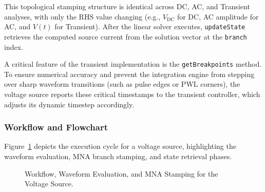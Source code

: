 This topological stamping structure is identical across DC, AC, and Transient analyses, with only the RHS value changing (e.g., $V_{\text{DC}}$ for DC, AC amplitude for AC, and $V(t)$ for Transient). After the linear solver executes, \texttt{updateState} retrieves the computed source current from the solution vector at the \texttt{branch} index.

A critical feature of the transient implementation is the \texttt{getBreakpoints} method. To ensure numerical accuracy and prevent the integration engine from stepping over sharp waveform transitions (such as pulse edges or PWL corners), the voltage source reports these critical timestamps to the transient controller, which adjusts its dynamic timestep accordingly.

\subsubsection{Workflow and Flowchart}
Figure~\ref{fig:vs_flowchart} depicts the execution cycle for a voltage source, highlighting the waveform evaluation, MNA branch stamping, and state retrieval phases.

\begin{figure}[H]
    \centering
    \caption{Workflow, Waveform Evaluation, and MNA Stamping for the Voltage Source.}
    \label{fig:vs_flowchart}
\end{figure}

